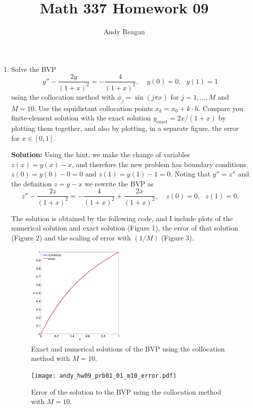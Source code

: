 \documentclass[11pt]{article}
\author{Andy Reagan}
\title{Math 337 Homework 09}
\def\f{\frac }
\begin{document}
\maketitle

\begin{enumerate}

\item Solve the BVP
\[ y'' - \f{2y}{(1+x)^2} = -\f{4}{(1+x)^2}, ~~~~~y(0)=0,~~~y(1) = 1\]
using the collocation method with $\phi _j = \sin (j\pi x)$ for $j = 1,\ldots,M$ and $M=10$.
Use the equidistant collocation points $x_k = x_0 + k\cdot h$.
Compare you finite-element solution with the exact solution $y_{\text{exact}} = 2x/(1+x)$ by plotting them together, and also by plotting, in a separate figure, the error for $x\in [0,1]$.

\bigskip
\textbf{Solution:} Using the hint, we make the change of variables $z(x) = y(x)-x$, and therefore the new problem has boundary conditions $z(0) = y(0) - 0 = 0$ and $z(1) = y(1) - 1 = 0$.
Noting that $y'' = z''$ and the definition $z = y-x$ we rewrite the BVP as
\[ z'' - \f{2z}{(1+x)^2} = -\f{4}{(1+x)^2} + \f{2x}{(1+x)^2}, ~~~~~z(0)=0,~~~z(1) = 0.\]

The solution is obtained by the following code, and I include plots of the numerical solution and exact solution (Figure 1), the error of that solution (Figure 2) and the scaling of error with $(1/M)$ (Figure 3).



\begin{figure}[h!]
  \centering
    \includegraphics[width=0.45\textwidth]{andy_hw09_prb01_01_m10.pdf}
  \caption{Exact and numerical solutions of the BVP using the collocation method with $M=10$.}
\end{figure}

\begin{figure}[h!]
  \centering
    \texttt{[image: andy\_hw09\_prb01\_01\_m10\_error.pdf]}
  \caption{Error of the solution to the BVP using the collocation method with $M=10$.}
\end{figure}


\end{enumerate}
\end{document}
